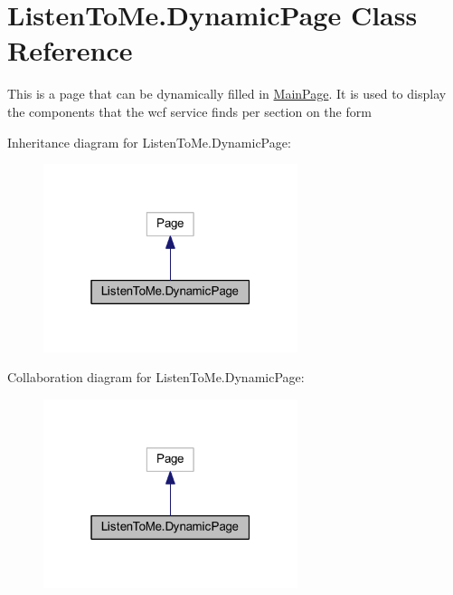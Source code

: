 \hypertarget{class_listen_to_me_1_1_dynamic_page}{}\section{Listen\+To\+Me.\+Dynamic\+Page Class Reference}
\label{class_listen_to_me_1_1_dynamic_page}


This is a page that can be dynamically filled in \hyperlink{class_listen_to_me_1_1_main_page}{Main\+Page}. It is used to display the components that the wcf service finds per section on the form  




Inheritance diagram for Listen\+To\+Me.\+Dynamic\+Page\+:
\nopagebreak
\begin{figure}[H]
\begin{center}
\leavevmode
\includegraphics[width=211pt]{class_listen_to_me_1_1_dynamic_page__inherit__graph}
\end{center}
\end{figure}


Collaboration diagram for Listen\+To\+Me.\+Dynamic\+Page\+:
\nopagebreak
\begin{figure}[H]
\begin{center}
\leavevmode
\includegraphics[width=211pt]{class_listen_to_me_1_1_dynamic_page__coll__graph}
\end{center}
\end{figure}
